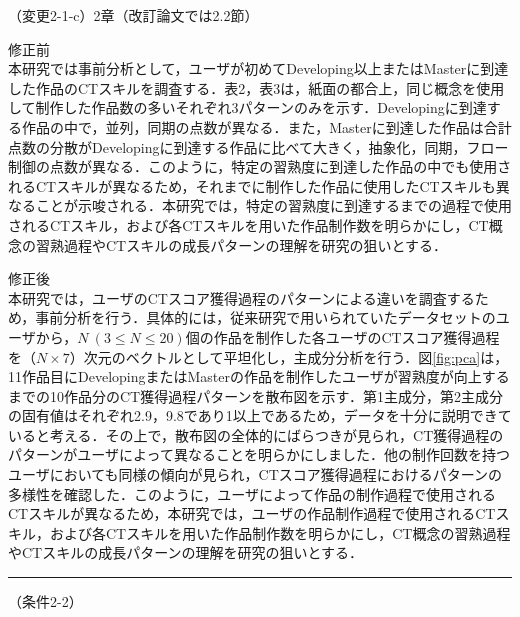 \documentclass{jarticle} %
\def\subsection#1{ \vspace{1pc} {\gt #1} }
\def\nextans{ \vspace{2pc} \hrule }
\begin{document}
\subsection{（変更2-1-c）2章（改訂論文では2.2節）}
\vspace{-0.3cm}
\begin{description}
\item 修正前\\
\phantom{　}
本研究では事前分析として，ユーザが初めてDeveloping以上またはMasterに到達した作品のCTスキルを調査する．表2，表3は，紙面の都合上，同じ概念を使用して制作した作品数の多いそれぞれ3パターンのみを示す．Developingに到達する作品の中で，並列，同期の点数が異なる．また，Masterに到達した作品は合計点数の分散がDevelopingに到達する作品に比べて大きく，抽象化，同期，フロー制御の点数が異なる．このように，特定の習熟度に到達した作品の中でも使用されるCTスキルが異なるため，それまでに制作した作品に使用したCTスキルも異なることが示唆される．本研究では，特定の習熟度に到達するまでの過程で使用されるCTスキル，および各CTスキルを用いた作品制作数を明らかにし，CT概念の習熟過程やCTスキルの成長パターンの理解を研究の狙いとする．
\vspace{-0.3cm}
\item 修正後\\
\phantom{　}
\color{red}
本研究では，ユーザのCTスコア獲得過程のパターンによる違いを調査するため，事前分析を行う．具体的には，従来研究\cite{Ando_2021}で用いられていたデータセットのユーザから，{$N~(3 \leq N \leq 20)$}個の作品を制作した各ユーザのCTスコア獲得過程を（$N \times 7$）次元のベクトルとして平坦化し，主成分分析を行う．図\ref{fig:pca}は，11作品目にDevelopingまたはMasterの作品を制作したユーザが習熟度が向上するまでの10作品分のCT獲得過程パターンを散布図を示す．第1主成分，第2主成分の固有値はそれぞれ2.9，9.8であり1以上であるため，データを十分に説明できていると考える．その上で，散布図の全体的にばらつきが見られ，CT獲得過程のパターンがユーザによって異なることを明らかにしました．他の制作回数を持つユーザにおいても同様の傾向が見られ，CTスコア獲得過程におけるパターンの多様性を確認した．このように，ユーザによって作品の制作過程で使用されるCTスキルが異なるため，本研究では，ユーザの作品制作過程で使用されるCTスキル，および各CTスキルを用いた作品制作数を明らかにし，CT概念の習熟過程やCTスキルの成長パターンの理解を研究の狙いとする．
\color{black}
\end{description}




\newpage
\nextans
\subsection{（条件2-2）}
\end{document}
